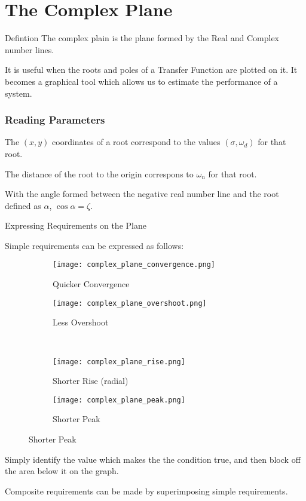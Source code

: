 \documentclass{../templates/topic}
\begin{document}
\graphicspath{{assets/}{ch3a_Time_Domain_Performance_Characteristics/assets/}}

\chapter{The Complex Plane}

\begin{section}{Defintion}
	The complex plain is the plane formed by the Real and Complex number lines.
	
	It is useful when the roots and poles of a Transfer Function are plotted on it. It becomes a graphical tool which allows us to estimate the performance of a system.
	\subsection{Reading Parameters}
		The $(x,y)$ coordinates of a root correspond to the values $(\sigma, \omega_d)$ for that root.
		
		The distance of the root to the origin correspons to $\omega_n$ for that root.
		
		With the angle formed between the negative real number line and the root defined as $\alpha$, $\cos{\alpha}=\zeta$.
\end{section}

\begin{section}{Expressing Requirements on the Plane}
	
	Simple requirements can be expressed as follows:
	
	\begin{figure}
		\centering
		
		\begin{subfigure}[b]{0.4\textwidth}
		\texttt{[image: complex\_plane\_convergence.png]}
		\caption{Quicker Convergence}
		\end{subfigure}
		\begin{subfigure}[b]{0.4\textwidth}
		\texttt{[image: complex\_plane\_overshoot.png]}
		\caption{Less Overshoot}
		\end{subfigure}
		\\
		\begin{subfigure}[b]{0.4\textwidth}
		\texttt{[image: complex\_plane\_rise.png]}
		\caption{Shorter Rise (radial)}
		\end{subfigure}
		\begin{subfigure}[b]{0.4\textwidth}
		\texttt{[image: complex\_plane\_peak.png]}
		\caption{Shorter Peak}
		\end{subfigure}

	\end{figure}
	
	Simply identify the value which makes the the condition true, and then block off the area below it on the graph.
	
	Composite requirements can be made by superimposing simple requirements.

\end{section}
\end{document}
